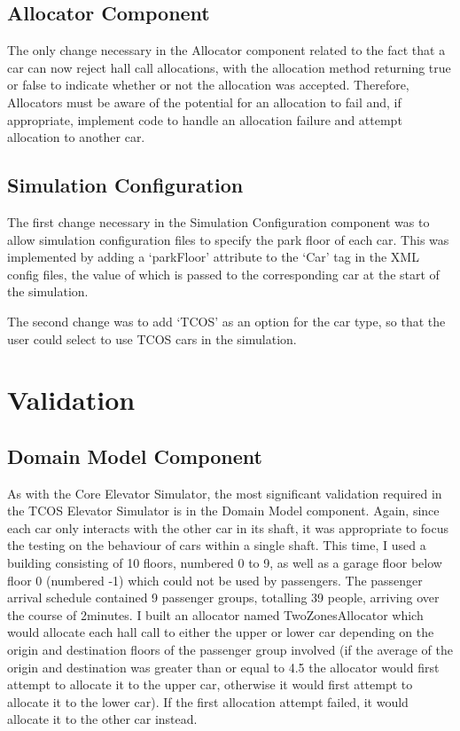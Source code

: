 \documentclass{UoYCSproject}
\begin{document}
\subsection{Allocator Component}

The only change necessary in the Allocator component related to the fact that a car can now reject hall call allocations, with the allocation method returning true or false to indicate whether or not the allocation was accepted.  Therefore, Allocators must be aware of the potential for an allocation to fail and, if appropriate, implement code to handle an allocation failure and attempt allocation to another car.

\subsection{Simulation Configuration}

The first change necessary in the Simulation Configuration component was to allow simulation configuration files to specify the park floor of each car.  This was implemented by adding a `parkFloor' attribute to the `Car' tag in the XML config files, the value of which is passed to the corresponding car at the start of the simulation.

The second change was to add `TCOS' as an option for the car type, so that the user could select to use TCOS cars in the simulation.

\section{Validation}

\subsection{Domain Model Component}
As with the Core Elevator Simulator, the most significant validation required in the TCOS Elevator Simulator is in the Domain Model component.  Again, since each car only interacts with the other car in its shaft, it was appropriate to focus the testing on the behaviour of cars within a single shaft.  This time, I used a building consisting of 10 floors, numbered 0 to 9, as well as a garage floor below floor 0 (numbered -1) which could not be used by passengers.  The passenger arrival schedule contained 9 passenger groups, totalling 39 people, arriving over the course of 2\textonehalf minutes.  I built an allocator named TwoZonesAllocator which would allocate each hall call to either the upper or lower car depending on the origin and destination floors of the passenger group involved (if the average of the origin and destination was greater than or equal to 4.5 the allocator would first attempt to allocate it to the upper car, otherwise it would first attempt to allocate it to the lower car).  If the first allocation attempt failed, it would allocate it to the other car instead.
\end{document}
